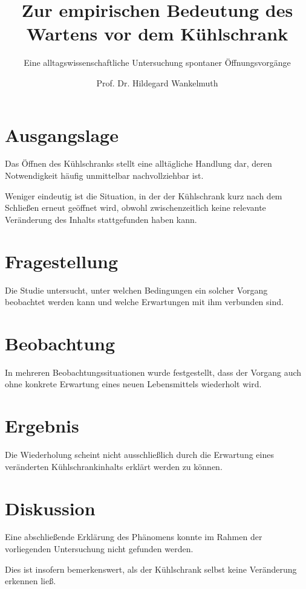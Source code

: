 \documentclass{alltagsforschung}
\title{Zur empirischen Bedeutung des Wartens vor dem Kühlschrank}
\subtitle{Eine alltagswissenschaftliche Untersuchung spontaner Öffnungsvorgänge}
\author{Prof. Dr. Hildegard Wankelmuth}
\begin{document}
\section{Ausgangslage}

Das Öffnen des Kühlschranks stellt eine alltägliche Handlung dar, deren
Notwendigkeit häufig unmittelbar nachvollziehbar ist.

Weniger eindeutig ist die Situation, in der der Kühlschrank kurz nach dem
Schließen erneut geöffnet wird, obwohl zwischenzeitlich keine relevante
Veränderung des Inhalts stattgefunden haben kann.

\section{Fragestellung}

Die Studie untersucht, unter welchen Bedingungen ein solcher Vorgang
beobachtet werden kann und welche Erwartungen mit ihm verbunden sind.

\section{Beobachtung}

In mehreren Beobachtungssituationen wurde festgestellt, dass der Vorgang
auch ohne konkrete Erwartung eines neuen Lebensmittels wiederholt wird.

\section{Ergebnis}

Die Wiederholung scheint nicht ausschließlich durch die Erwartung eines
veränderten Kühlschrankinhalts erklärt werden zu können.

\section{Diskussion}

Eine abschließende Erklärung des Phänomens konnte im Rahmen der vorliegenden
Untersuchung nicht gefunden werden.

Dies ist insofern bemerkenswert, als der Kühlschrank selbst keine
Veränderung erkennen ließ.
\end{document}
